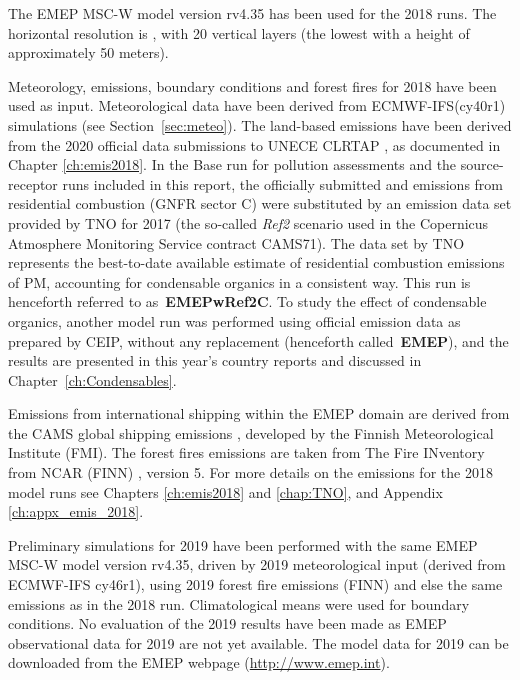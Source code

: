 The EMEP MSC-W model version rv4.35 has been used for the 2018
runs. The horizontal resolution is \resZO, with 20 vertical layers
(the lowest with a height of approximately 50 meters).

 Meteorology, emissions, boundary conditions and forest fires for 2018 have been
 used as input. Meteorological data have been
 derived from ECMWF-IFS(cy40r1) simulations (see Section~\ref{sec:meteo}). The
 land-based emissions have been derived from the 2020 official data
 submissions to UNECE CLRTAP \citep{CEIP2020}, as documented in
 Chapter \ref{ch:emis2018}. In the Base run for pollution assessments and the source-receptor runs included in this report, the officially submitted \PM[10] and \PM[2.5] emissions from residential combustion (GNFR sector C) were substituted by an emission data set provided by TNO for 2017 (the so-called \textit{Ref2} scenario used in the Copernicus Atmosphere Monitoring Service contract CAMS71). The data set by TNO represents the best-to-date available estimate of residential combustion emissions of PM, accounting for condensable organics in a consistent way. This run is henceforth referred to as~\textbf{EMEPwRef2C}. To study the effect of condensable organics, another model run was performed using official emission data as prepared by CEIP, without any replacement (henceforth called~\textbf{EMEP}), and the results are presented in this year's country reports \citep{Klein:2020} and discussed in Chapter~\ref{ch:Condensables}.
 
 Emissions from international shipping
 within the EMEP domain are derived from the CAMS global shipping
 emissions \citep{CAMSemis2019}, developed by the Finnish
 Meteorological Institute (FMI). The forest fires emissions are taken from
 The Fire INventory from NCAR (FINN) \citep{FINNIGAN1990}, version 5.
 For more details on the emissions for the 2018 model runs see Chapters
 \ref{ch:emis2018} and \ref{chap:TNO}, and Appendix \ref{ch:appx_emis_2018}.

 Preliminary simulations for 2019 have been performed with the same
 EMEP MSC-W model version rv4.35, driven by 2019 meteorological
 input (derived from ECMWF-IFS cy46r1), using 2019 forest fire emissions (FINN)
 and else the same emissions as in the 2018 run. Climatological
 means were used for boundary conditions. No evaluation of the 2019
 results have been made as EMEP observational data for 2019 are not yet
 available. The model data for 2019 can be downloaded from the EMEP
 webpage (\url{http://www.emep.int}).

